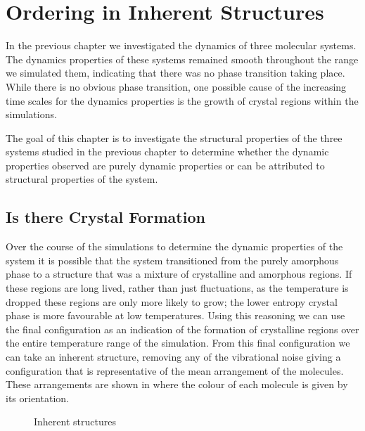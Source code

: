 \chapter{Ordering in Inherent Structures}

In the previous chapter we investigated the dynamics of three molecular systems. The dynamics properties of these systems remained smooth throughout the range we simulated them, indicating that there was no phase transition taking place. While there is no obvious phase transition, one possible cause of the increasing time scales for the dynamics properties is the growth of crystal regions within the simulations.

The goal of this chapter is to investigate the structural properties of the three systems studied in the previous chapter to determine whether the dynamic properties observed are purely dynamic properties or can be attributed to structural properties of the system.

\section{Is there Crystal Formation}

Over the course of the simulations to determine the dynamic properties of the system it is possible that the system transitioned from the purely amorphous phase to a structure that was a mixture of crystalline and amorphous regions. If these regions are long lived, rather than just fluctuations, as the temperature is dropped these regions are only more likely to grow; the lower entropy crystal phase is more favourable at low temperatures. Using this reasoning we can use the final configuration as an indication of the formation of crystalline regions over the entire temperature range of the simulation. From this final configuration we can take an inherent structure, removing any of the vibrational noise giving a configuration that is representative of the mean arrangement of the molecules. These arrangements are shown in  where the colour of each molecule is given by its orientation.

\begin{figure}
    \caption{Inherent structures}
    \label{fig:inherent structures frame}
\end{figure}


